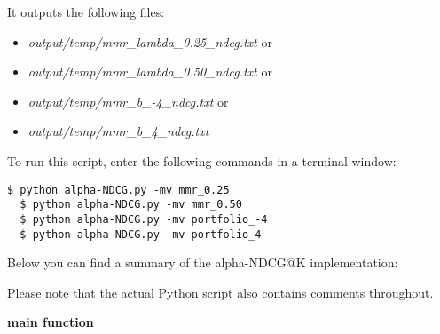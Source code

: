 \documentclass{article} %
\begin{document}
It outputs the following files:

\begin{itemize}
    \item \textit{output/temp/mmr\_lambda\_0.25\_ndcg.txt} or
    \item \textit{output/temp/mmr\_lambda\_0.50\_ndcg.txt} or
    \item \textit{output/temp/mmr\_b\_-4\_ndcg.txt} or
    \item \textit{output/temp/mmr\_b\_4\_ndcg.txt}
\end{itemize}

To run this script, enter the following commands in a terminal window:

\begin{lstlisting}[style=Bash]
  $ python alpha-NDCG.py -mv mmr_0.25
  $ python alpha-NDCG.py -mv mmr_0.50
  $ python alpha-NDCG.py -mv portfolio_-4
  $ python alpha-NDCG.py -mv portfolio_4
\end{lstlisting}

Below you can find a summary of the alpha-NDCG@K implementation:

Please note that the actual Python script also contains comments throughout.

\textbf{main function}
\end{document}

